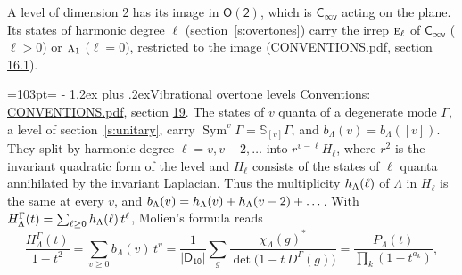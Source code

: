 \documentclass[10pt,a4paper]{article}
\makeatletter
\renewcommand\section{\@startsection{section}{1}{\z@}{-3ex plus -1ex minus -.2ex}%
  {1.2ex plus .2ex}{\normalfont\large\sffamily\bfseries\color{parttitle}}}
\newcommand{\needspace}[1]{\par\penalty-100\begingroup\dimen0=#1\relax\dimen2=\pagegoal
  \advance\dimen2-\pagetotal\ifdim\dimen0>\dimen2\relax\ifdim\dimen2>0pt\vfil\break\fi\fi
  \endgroup}
\numberwithin{equation}{section}
\newcommand{\grp}[1]{\mathsf{#1}}
\newcommand{\irr}[1]{\text{\normalfont\scshape #1}}
\newcommand{\repD}[1]{D^{#1}}
\newcommand{\irchar}[1]{\chi_{#1}}
\newcommand{\conj}[1]{{#1}^{*}}
\newcommand{\schur}[1]{\mathbb{S}_{#1}}
\newcommand{\shape}[1]{[#1]}
\makeatother
\begin{document}
A level of dimension 2 has its image in $\grp{O(2)}$, which is \href{Cinfv.pdf}{$\grp{C_{\infty v}}$} acting on the plane. \label{n:index.harmonic.degree}Its states of harmonic degree $\ell$ (section~\ref{s:overtones}) carry the irrep $\irr{e}_{\ell}$ of \href{Cinfv.pdf}{$\grp{C_{\infty v}}$} ($\ell > 0$) or $\irr{a}_{1}$ ($\ell = 0$), restricted to the image (\href{../../CONVENTIONS.pdf}{CONVENTIONS.pdf}, section \href{../../CONVENTIONS.pdf\#conv.16.1}{16.1}).
\needspace{103pt}
\section{Vibrational overtone levels}\label{s:overtones}
Conventions: \href{../../CONVENTIONS.pdf}{CONVENTIONS.pdf}, section \href{../../CONVENTIONS.pdf\#conv.19}{19}.
\leavevmode\label{n:index.quanta}\label{n:operator.symmetric.power}The states of $v$ quanta of a degenerate mode $\Gamma$, a level of section~\ref{s:unitary}, carry $\operatorname{Sym}^{v}\Gamma = \schur{\shape{v}}\Gamma$, and $b_\Lambda(v) = b_\Lambda(\shape{v})$. \label{n:local.quadratic.form}\label{n:set.harmonic}They split by harmonic degree $\ell = v, v - 2, \dots$ into $r^{v-\ell}H_\ell$, where $r^2$ is the invariant quadratic form of the level and $H_\ell$ consists of the states of $\ell$ quanta annihilated by the invariant Laplacian. \label{n:function.multiplicity.harmonic}Thus the multiplicity $\mathnormal{h}_\Lambda(\ell)$ of $\Lambda$ in $H_\ell$ is the same at every $v$, and $b_\Lambda(v) = \mathnormal{h}_\Lambda(v) + \mathnormal{h}_\Lambda(v - 2) + \dots$. \label{n:function.generating.level}With $H^{\Gamma}_\Lambda(t) = \sum_{\ell\ge0} \mathnormal{h}_\Lambda(\ell)\,t^{\ell}$, Molien's formula reads
\begin{equation}\label{e:molien}\frac{H^{\Gamma}_\Lambda(t)}{1 - t^2} = \sum_{v\ge0} b_\Lambda(v)\,t^v = \frac{1}{|\grp{D_{10}}|}\sum_{g}\frac{\conj{\irchar{\Lambda}(g)}}{\det\bigl(1 - t\,\repD{\Gamma}(g)\bigr)} = \frac{P_\Lambda(t)}{\prod_k (1-t^{a_k})},\end{equation}
\end{document}
